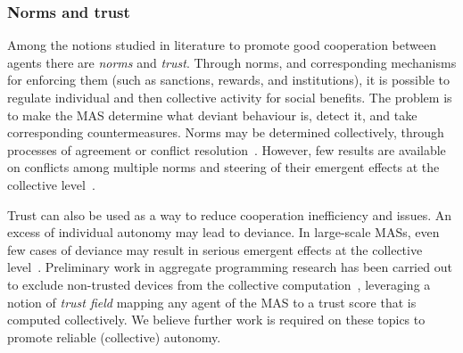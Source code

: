 \subsubsection{Norms and trust}

Among the notions 
 studied in literature
 to promote good cooperation between agents 
 there are \emph{norms} and \emph{trust}.
%
Through norms, and corresponding mechanisms for 
 enforcing them (such as sanctions, rewards, and institutions),
 it is possible to regulate individual and then collective activity
 for social benefits.
%
The problem is to make the MAS determine what deviant behaviour is,
 detect it, and take corresponding countermeasures.
%
Norms may be determined collectively,
 through processes of agreement
 or conflict resolution~\cite{DBLP:journals/aamas/SantosZSSV17}.
%
However, few results are available on conflicts among multiple norms
 and steering of their emergent effects at the collective level~\cite{DBLP:journals/aamas/SantosZSSV17}.

Trust can also be used as a way to reduce cooperation inefficiency and issues.
%
An excess of individual autonomy 
 may lead to deviance.
%
In large-scale MASs,
 even few cases of deviance may result in 
 serious emergent effects at the collective level~\cite{DBLP:journals/tomacs/Aldini18}.
%
Preliminary work in aggregate programming research
 has been carried out
 to exclude non-trusted devices
 from the collective computation~\cite{casadei2018scp},
 leveraging a notion of \emph{trust field} 
 mapping any agent of the MAS to a trust score
 that is computed collectively.
%
We believe further work is required on these topics
 to promote reliable (collective) autonomy.


